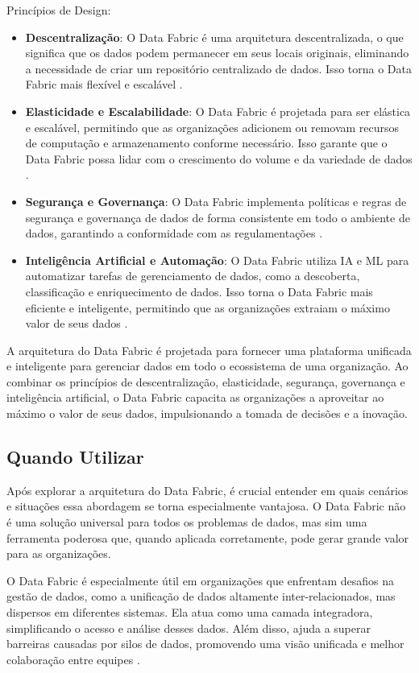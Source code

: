 Princípios de Design:
\begin{itemize}
    \item \textbf{Descentralização}: O Data Fabric é uma arquitetura descentralizada, o que significa que os dados podem permanecer em seus locais originais, eliminando a necessidade de criar um repositório centralizado de dados. Isso torna o Data Fabric mais flexível e escalável \cite{sharma2023data}.
    \item \textbf{Elasticidade e Escalabilidade}: O Data Fabric é projetada para ser elástica e escalável, permitindo que as organizações adicionem ou removam recursos de computação e armazenamento conforme necessário. Isso garante que o Data Fabric possa lidar com o crescimento do volume e da variedade de dados \cite{sharma2023data}.
    \item \textbf{Segurança e Governança}: O Data Fabric implementa políticas e regras de segurança e governança de dados de forma consistente em todo o ambiente de dados, garantindo a conformidade com as regulamentações \cite{sharma2023data}.
    \item \textbf{Inteligência Artificial e Automação}: O Data Fabric utiliza IA e ML para automatizar tarefas de gerenciamento de dados, como a descoberta, classificação e enriquecimento de dados. Isso torna o Data Fabric mais eficiente e inteligente, permitindo que as organizações extraiam o máximo valor de seus dados \cite{hechler2023data}.
\end{itemize}

A arquitetura do Data Fabric é projetada para fornecer uma plataforma unificada e inteligente para gerenciar dados em todo o ecossistema de uma organização. Ao combinar 
os princípios de descentralização, elasticidade, segurança, governança e inteligência artificial, o Data Fabric capacita as organizações a aproveitar ao máximo o valor 
de seus dados, impulsionando a tomada de decisões e a inovação.

\subsection{Quando Utilizar}
Após explorar a arquitetura do Data Fabric, é crucial entender em quais cenários e situações essa abordagem se torna especialmente vantajosa. O Data Fabric não é 
uma solução universal para todos os problemas de dados, mas sim uma ferramenta poderosa que, quando aplicada corretamente, pode gerar grande valor para as organizações.

O Data Fabric é especialmente útil em organizações que enfrentam desafios na gestão de dados, como a unificação de dados altamente inter-relacionados, mas dispersos 
em diferentes sistemas. Ela atua como uma camada integradora, simplificando o acesso e análise desses dados. Além disso, ajuda a superar barreiras causadas por silos 
de dados, promovendo uma visão unificada e melhor colaboração entre equipes \cite{barik2022data}.

